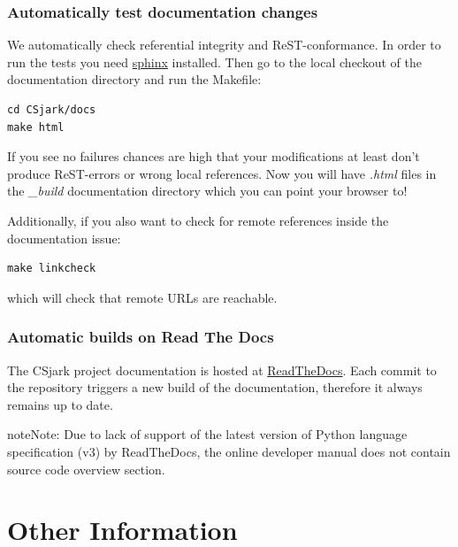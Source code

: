 \documentclass[A4paper,10pt,english]{sphinxmanual}
\begin{document}
\subsection{Automatically test documentation changes}
\label{devel/docs:rest-quickstart}\label{devel/docs:automatically-test-documentation-changes}\label{devel/docs:sphinx-home-page}
We automatically check referential integrity and ReST-conformance.  In order to
run the tests you need \href{http://sphinx.pocoo.org/}{sphinx} installed.  Then go to the local checkout
of the documentation directory and run the Makefile:

\begin{Verbatim}[commandchars=\\\{\}]
cd CSjark/docs
make html
\end{Verbatim}

If you see no failures chances are high that your modifications at least
don't produce ReST-errors or wrong local references. Now you will have \emph{.html}
files in the \emph{\_build} documentation directory which you can point your browser to!

Additionally, if you also want to check for remote references inside
the documentation issue:

\begin{Verbatim}[commandchars=\\\{\}]
make linkcheck
\end{Verbatim}

which will check that remote URLs are reachable.


\subsection{Automatic builds on Read The Docs}
\label{devel/docs:automatic-builds-on-read-the-docs}
The CSjark project documentation is hosted at \href{http://csjark.readthedocs.org/}{ReadTheDocs}. Each commit to the repository triggers a new build of the documentation, therefore it always remains up to date.

\begin{notice}{note}{Note:}
Due to lack of support of the latest version of Python language specification (v3) by ReadTheDocs,
the online developer manual does not contain source code overview section.
\end{notice}


\chapter{Other Information}
\label{index:other-information}
\end{document}
